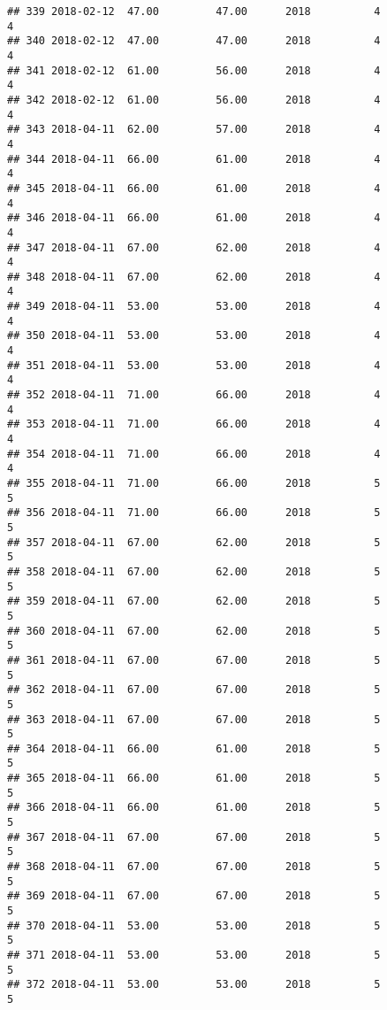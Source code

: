 \documentclass[]{article}
\begin{document}
\begin{verbatim}
## 339 2018-02-12  47.00         47.00      2018          4                 4
## 340 2018-02-12  47.00         47.00      2018          4                 4
## 341 2018-02-12  61.00         56.00      2018          4                 4
## 342 2018-02-12  61.00         56.00      2018          4                 4
## 343 2018-04-11  62.00         57.00      2018          4                 4
## 344 2018-04-11  66.00         61.00      2018          4                 4
## 345 2018-04-11  66.00         61.00      2018          4                 4
## 346 2018-04-11  66.00         61.00      2018          4                 4
## 347 2018-04-11  67.00         62.00      2018          4                 4
## 348 2018-04-11  67.00         62.00      2018          4                 4
## 349 2018-04-11  53.00         53.00      2018          4                 4
## 350 2018-04-11  53.00         53.00      2018          4                 4
## 351 2018-04-11  53.00         53.00      2018          4                 4
## 352 2018-04-11  71.00         66.00      2018          4                 4
## 353 2018-04-11  71.00         66.00      2018          4                 4
## 354 2018-04-11  71.00         66.00      2018          4                 4
## 355 2018-04-11  71.00         66.00      2018          5                 5
## 356 2018-04-11  71.00         66.00      2018          5                 5
## 357 2018-04-11  67.00         62.00      2018          5                 5
## 358 2018-04-11  67.00         62.00      2018          5                 5
## 359 2018-04-11  67.00         62.00      2018          5                 5
## 360 2018-04-11  67.00         62.00      2018          5                 5
## 361 2018-04-11  67.00         67.00      2018          5                 5
## 362 2018-04-11  67.00         67.00      2018          5                 5
## 363 2018-04-11  67.00         67.00      2018          5                 5
## 364 2018-04-11  66.00         61.00      2018          5                 5
## 365 2018-04-11  66.00         61.00      2018          5                 5
## 366 2018-04-11  66.00         61.00      2018          5                 5
## 367 2018-04-11  67.00         67.00      2018          5                 5
## 368 2018-04-11  67.00         67.00      2018          5                 5
## 369 2018-04-11  67.00         67.00      2018          5                 5
## 370 2018-04-11  53.00         53.00      2018          5                 5
## 371 2018-04-11  53.00         53.00      2018          5                 5
## 372 2018-04-11  53.00         53.00      2018          5                 5

\end{verbatim}
\end{document}

